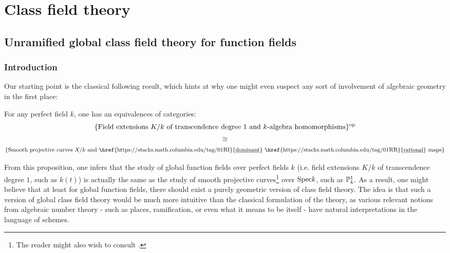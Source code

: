 \chapter{Class field theory}
    \begin{abstract}
        
    \end{abstract}
    
    \minitoc
    
    \section{Unramified global class field theory for function fields}
        \subsection{Introduction}
            Our starting point is the classical following result, which hints at why one might even suspect any sort of involvement of algebraic geometry in the first place:
            \begin{proposition} \label{prop: curves_and_function_fields}
                \cite[\href{https://stacks.math.columbia.edu/tag/0BY1}{Tag 0BY1}]{stacks} For any perfect field $k$, one has an equivalences of categories:
                    $$\{\text{Field extensions $K/k$ of transcendence degree $1$ and $k$-algebra homomorphisms}\}^{\op}$$
                    $$\cong$$
                    $$\{\text{Smooth projective curves $X/k$ and \href{https://stacks.math.columbia.edu/tag/01RI}{\underline{dominant}} \href{https://stacks.math.columbia.edu/tag/01RR}{\underline{rational}} maps}\}$$
            \end{proposition}
            From this proposition, one infers that the study of global function fields over perfect fields $k$ (i.e. field extensions $K/k$ of transcendence degree $1$, such as $k(t)$) is actually the same as the study of smooth projective curves\footnote{The reader might also wish to consult \cite[Sections I.13 and I.14]{neukirch_2010_algebraic_number_theory}.} over $\Spec k$, such as $\P^1_k$. As a result, one might believe that at least for global function fields, there should exist a purely geometric version of class field theory. The idea is that such a version of global class field theory would be much more intuitive than the classical formulation of the theory, as various relevant notions from algebraic number theory - such as places, ramification, or even what it means to be  itself - have natural interpretations in the language of schemes. 
            
